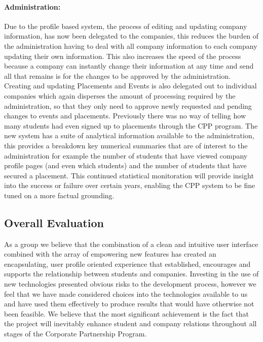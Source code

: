 \paragraph{Administration:}
	Due to the profile based system, the process of editing and updating company information, has now been delegated to the companies, this reduces the burden of the administration having to deal with all company information to each company updating their own information. This also increases the speed of the process because a company can instantly change their information at any time and send all that remains is for the changes to be approved by the administration.
	Creating and updating Placements and Events is also delegated out to individual companies which again disperses the amount of processing required by the administration, so that they only need to approve newly requested and pending changes to events and placements.
	Previously there was no way of telling how many students had even signed up to placements through the CPP program. The new system has a suite of analytical information available to the administration, this provides a breakdown key numerical summaries that are of interest to the administration for example the number of students that have viewed company profile pages (and even which students) and the number of students that have secured a placement. This continued statistical monitoration will provide insight into the success or failure over certain years, enabling the CPP system to be fine tuned on a more factual grounding. 

\subsection{Overall Evaluation}
As a group we believe that the combination of a clean and intuitive user interface combined with the array of empowering new features has created an encapsulating, user profile oriented experience that established, encourages and supports the relationship between students and companies. 
Investing in the use of new technologies presented obvious risks to the development process, however we feel that we have made considered choices into the technologies available to us and have used them effectively to produce results that would have otherwise not been feasible.
We believe that the most significant achievement is the fact that the project will inevitably enhance student and company relations throughout all stages of the Corporate Partnership Program.
